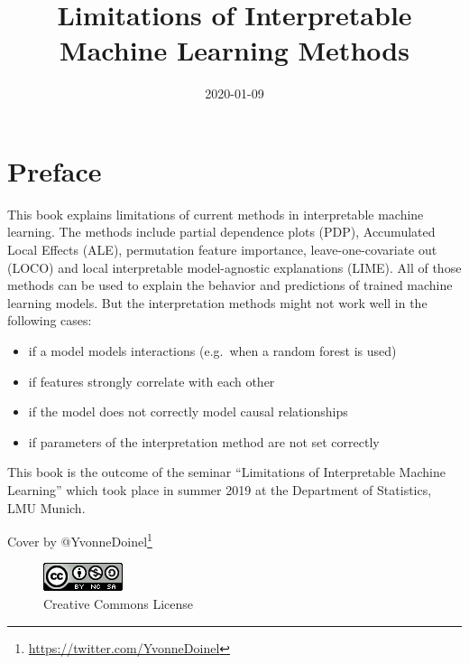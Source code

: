 \documentclass[]{krantz}
\title{Limitations of Interpretable Machine Learning Methods}
\author{}
\date{\vspace{-2.5em}2020-01-09}
\providecommand{\tightlist}{%
  \setlength{\itemsep}{0pt}\setlength{\parskip}{0pt}}
\renewcommand{\href}[2]{#2\footnote{\url{#1}}}
\begin{document}
\maketitle


\thispagestyle{empty}

\begin{center}
\end{center}

\setlength{\abovedisplayskip}{-5pt}
\setlength{\abovedisplayshortskip}{-5pt}

{
\hypersetup{linkcolor=black}
\setcounter{tocdepth}{0}
\tableofcontents
}
\chapter*{Preface}\label{preface}


This book explains limitations of current methods in interpretable
machine learning. The methods include partial dependence plots (PDP),
Accumulated Local Effects (ALE), permutation feature importance,
leave-one-covariate out (LOCO) and local interpretable model-agnostic
explanations (LIME). All of those methods can be used to explain the
behavior and predictions of trained machine learning models. But the
interpretation methods might not work well in the following cases:

\begin{itemize}
\tightlist
\item
  if a model models interactions (e.g.~when a random forest is used)
\item
  if features strongly correlate with each other
\item
  if the model does not correctly model causal relationships
\item
  if parameters of the interpretation method are not set correctly
\end{itemize}

This book is the outcome of the seminar ``Limitations of Interpretable
Machine Learning'' which took place in summer 2019 at the Department of
Statistics, LMU Munich.

Cover by \href{https://twitter.com/YvonneDoinel}{@YvonneDoinel}

\begin{figure}
\centering
\includegraphics{images/by-nc-sa.png}
\caption{Creative Commons License}
\end{figure}
\end{document}
